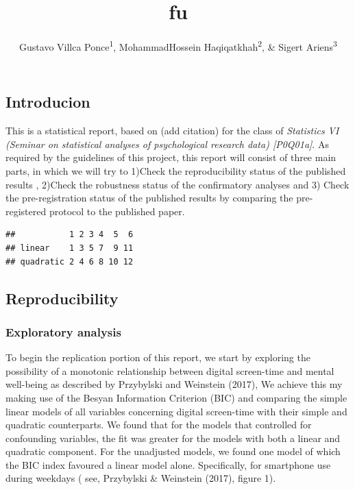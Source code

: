 \documentclass[man]{apa6}
\title{fu}
\author{Gustavo Villca Ponce\textsuperscript{1}, MohammadHossein Haqiqatkhah\textsuperscript{2}, \& Sigert Ariens\textsuperscript{3}}
\affiliation{
    \vspace{0.5cm}
          \textsuperscript{1} student number:r0292033\\
          \textsuperscript{2} student number:r0607671\\
          \textsuperscript{3} student number:  }
\theoremstyle{definition}
\theoremstyle{definition}
\theoremstyle{definition}
\theoremstyle{remark}
\begin{document}
\maketitle

\setcounter{secnumdepth}{0}



\hypertarget{introducion}{%
\subsection{Introducion}\label{introducion}}

This is a statistical report, based on (add citation) for the class of
\emph{Statistics VI (Seminar on statistical analyses of psychological
research data) {[}P0Q01a{]}}. As required by the guidelines of this
project, this report will consist of three main parts, in which we will
try to 1)Check the reproducibility status of the published results ,
2)Check the robustness status of the confirmatory analyses and 3) Check
the pre-registration status of the published results by comparing the
pre-registered protocol to the published paper.

\begin{verbatim}
##           1 2 3 4  5  6
## linear    1 3 5 7  9 11
## quadratic 2 4 6 8 10 12
\end{verbatim}

\hypertarget{reproducibility}{%
\subsection{Reproducibility}\label{reproducibility}}

\hypertarget{exploratory-analysis}{%
\subsubsection{Exploratory analysis}\label{exploratory-analysis}}

To begin the replication portion of this report, we start by exploring
the possibility of a monotonic relationship between digital screen-time
and mental well-being as described by Przybylski and Weinstein (2017),
We achieve this my making use of the Besyan Information Criterion (BIC)
and comparing the simple linear models of all variables concerning
digital screen-time with their simple and quadratic counterparts. We
found that for the models that controlled for confounding variables, the
fit was greater for the models with both a linear and quadratic
component. For the unadjusted models, we found one model of which the
BIC index favoured a linear model alone. Specifically, for smartphone
use during weekdays ( see, Przybylski \& Weinstein (2017), figure 1).
\end{document}
